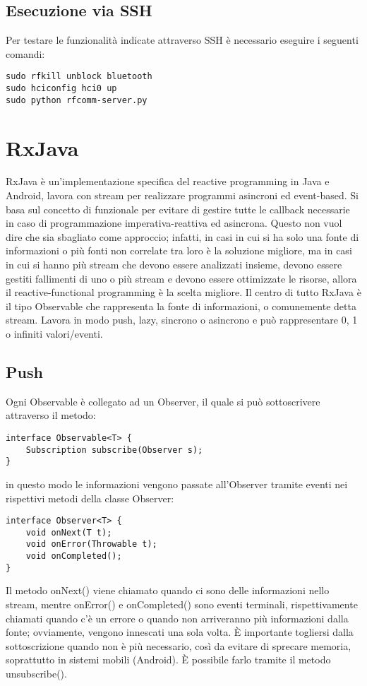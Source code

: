 \documentclass{article}
\begin{document}
\subsection{Esecuzione via SSH}
Per testare le funzionalità indicate attraverso SSH è necessario eseguire i seguenti comandi:
\begin{lstlisting}
sudo rfkill unblock bluetooth
sudo hciconfig hci0 up
sudo python rfcomm-server.py 
\end{lstlisting}
\newpage
\section{RxJava}
RxJava è un’implementazione specifica del reactive programming in Java e Android, lavora con stream per realizzare programmi asincroni ed event-based. Si basa sul concetto di funzionale per evitare di gestire tutte le callback necessarie in caso di programmazione imperativa-reattiva ed asincrona. Questo non vuol dire che sia sbagliato come approccio; infatti, in casi in cui si ha solo una fonte di informazioni o più fonti non correlate tra loro è la soluzione migliore, ma in casi in cui si hanno più stream che devono essere analizzati insieme, devono essere gestiti fallimenti di uno o più stream e devono essere ottimizzate le risorse, allora il reactive-functional programming è la scelta migliore.
Il centro di tutto RxJava è il tipo Observable che rappresenta la fonte di informazioni, o comunemente detta stream. Lavora in modo push, lazy, sincrono o asincrono e può rappresentare 0, 1 o infiniti valori/eventi.
\subsection{Push}
Ogni Observable è collegato ad un Observer, il quale si può sottoscrivere attraverso il metodo:
\begin{lstlisting}
interface Observable<T> {
	Subscription subscribe(Observer s);
}
\end{lstlisting} 
in questo modo le informazioni vengono passate all’Observer tramite eventi nei rispettivi metodi della classe Observer:
\begin{lstlisting}
interface Observer<T> {
	void onNext(T t);
	void onError(Throwable t);
	void onCompleted();
}
\end{lstlisting}
Il metodo onNext() viene chiamato quando ci sono delle informazioni nello stream, mentre onError() e onCompleted() sono eventi terminali, rispettivamente chiamati quando c’è un errore o quando non arriveranno più informazioni dalla fonte; ovviamente, vengono innescati una sola volta.
È importante togliersi dalla sottoscrizione quando non è più necessario, così da evitare di sprecare memoria, soprattutto in sistemi mobili (Android). È possibile farlo tramite il metodo unsubscribe().
\end{document}
